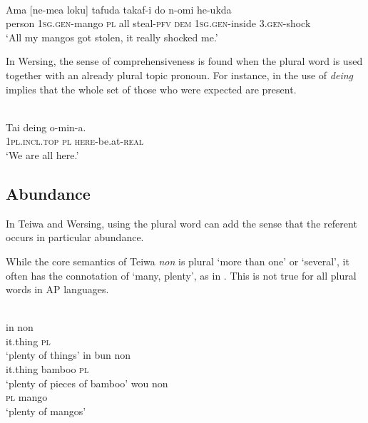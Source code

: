 \ea%
\label{ex:9:71}
 \\
\gll  Ama [ne-mea loku] tafuda takaf-i  do n-omi he-ukda \\
    person \textsc{1sg.gen-}mango \textsc{pl} all steal-\textsc{pfv}  \textsc{dem} \textsc{1sg.gen-}inside 3.\textsc{gen-}shock \\
\glt `All my mangos got stolen,  it really shocked me.' %
\z












In Wersing, the sense of comprehensiveness is found when the plural word is used together with an already plural topic pronoun. For instance, in  the use of \textit{deing} implies that the whole set of those who were expected are present.


\ea%
\label{ex:9:72}
 \\
\gll Tai deing o-min-a.  \\
   \textsc{1pl.incl.top} \textsc{pl}   \textsc{here}-be.at-\textsc{real}  \\
\glt `We are all here.'
\z






\subsection{Abundance} %
\label{sec:9:4.2}
In Teiwa and Wersing, using the plural word can add the sense that the referent occurs in particular abundance.

While the core semantics of Teiwa \textit{non} is plural `more than one' or `several', it often has the connotation of `many, plenty', as in . This is not true for all plural words in AP languages.


\ea%
\label{ex:9:73}
 \\
\ea
\gll  in  non\\
   it.thing  \textsc{pl} \\
   \glt `plenty of things' 
\ex
\gll in  bun non \\
it.thing bamboo \textsc{pl} \\
\glt `plenty of pieces of bamboo'
\ex 
\gll wou  non\\
\textsc{pl} mango\\
\glt  `plenty of mangos'
\z
\z

